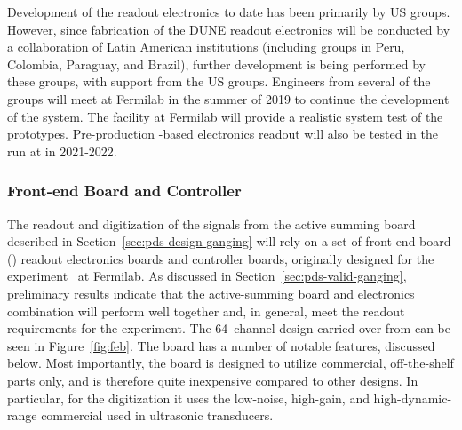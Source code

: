Development of the readout electronics to date has been primarily by US groups. 
However, since fabrication of the DUNE readout electronics will be conducted by a collaboration of Latin American institutions (including groups in Peru, Colombia, Paraguay, and Brazil), further development is being performed by these groups, with support from the US groups.  Engineers from several of the groups will meet at Fermilab in the summer of 2019 to continue the development of the system. The  facility at Fermilab will provide a realistic system test of the prototypes.  Pre-production -based electronics readout will also be tested in the  run at  in 2021-2022.

\subsubsection{Front-end Board and Controller}

The readout and digitization of the signals from the active summing board described in Section~\ref{sec:pds-design-ganging} will rely on a set of front-end board () readout electronics boards and controller boards, originally designed for the  experiment~\cite{bib:mu2e_tdr}
at Fermilab. As discussed in Section~\ref{sec:pds-valid-ganging}, preliminary results indicate that the active-summing board and  electronics  combination will perform well together and, in general, meet the readout requirements for the experiment. The 64~channel  design carried over from  can be seen in Figure~\ref{fig:feb}. The board has a number of notable features, discussed below. Most importantly,  
the board is designed to utilize commercial, off-the-shelf parts only, and is therefore quite inexpensive compared to other designs. In particular, for the digitization it uses the low-noise, high-gain, and high-dynamic-range commercial  used in ultrasonic transducers. 

